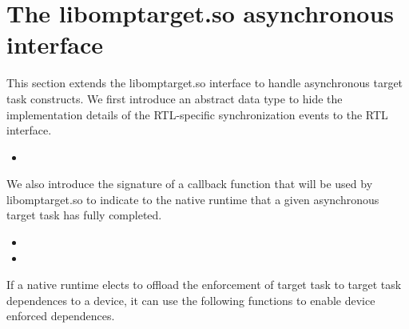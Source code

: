 
\section{The libomptarget.so asynchronous interface} \label{sc:LibomptargetAsync}

This section extends the libomptarget.so interface to handle asynchronous target task constructs. We first introduce an abstract data type to hide the implementation details of the RTL-specific synchronization events to the RTL interface.

\begin{itemize}
  \item {}
\end{itemize}

We also introduce the signature of a callback function that will be used by libomptarget.so to indicate to the native runtime that a given asynchronous target task has fully completed.

\begin{itemize}
  \item {}
   \item {}
\end{itemize}

If a native runtime elects to offload the enforcement of target task to target task dependences to a device, it can use the following functions to enable device enforced dependences.

